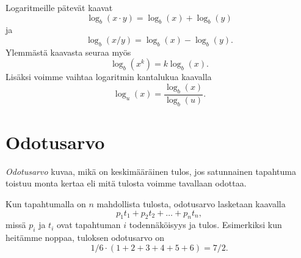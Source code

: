 Logaritmeille pätevät kaavat
\[\log_b(x \cdot y) = \log_b(x)+\log_b(y)\]
ja
\[\log_b(x / y) = \log_b(x)-\log_b(y).\]
Ylemmästä kaavasta seuraa myös
\[\log_b(x^k) = k \log_b(x).\]
Lisäksi voimme vaihtaa logaritmin kantalukua kaavalla
\[\log_u(x) = \frac{\log_b(x)}{\log_b(u)}.\]

\section*{Odotusarvo}


\emph{Odotusarvo} kuvaa, mikä on keskimääräinen tulos,
jos satunnainen tapahtuma toistuu monta kertaa eli mitä
tulosta voimme tavallaan odottaa.

Kun tapahtumalla on $n$ mahdollista tulosta,
odotusarvo lasketaan kaavalla
\[p_1 t_1 + p_2 t_2 + \dots + p_n t_n,\]
missä $p_i$ ja $t_i$ ovat tapahtuman $i$ todennäköisyys ja tulos.
Esimerkiksi kun heitämme noppaa, tuloksen odotusarvo on
\[1/6 \cdot (1+2+3+4+5+6) = 7/2.\]
